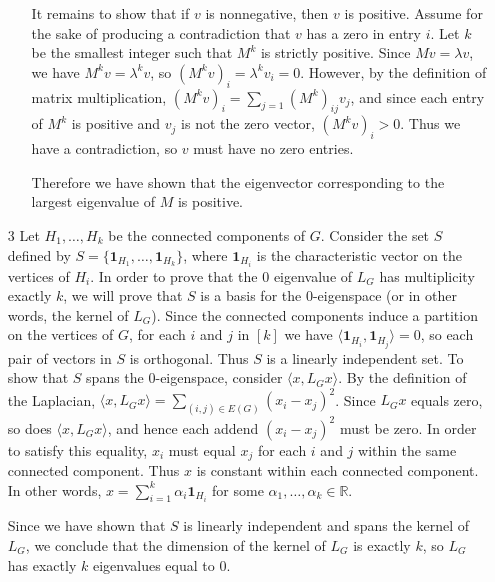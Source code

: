 \documentclass{article}
\newcommand{\R}{\mathbb{R}}
\newcommand{\1}{\mathbf{1}}
\newcommand{\0}{\mathbf{0}}
\begin{document}
\begin{enumerate}
\begin{enumerate}
    It remains to show that if $v$ is nonnegative, then $v$ is positive.
    Assume for the sake of producing a contradiction that $v$ has a zero in entry $i$.
    Let $k$ be the smallest integer such that $M^k$ is strictly positive.
    Since $M v = \lambda v$, we have $M^k v = \lambda^k v$, so $(M^k v)_i = \lambda^k v_i = 0$.
    However, by the definition of matrix multiplication, $(M^k v)_i = \sum_{j = 1} (M^k)_{ij} v_j$, and since each entry of $M^k$ is positive and $v_j$ is not the zero vector, $(M^k v)_i > 0$.
    Thus we have a contradiction, so $v$ must have no zero entries.

    Therefore we have shown that the eigenvector corresponding to the largest eigenvalue of $M$ is positive.
  \end{enumerate}

\item[3]
  Let $H_1, \dotsc, H_k$ be the connected components of $G$.
  Consider the set $S$ defined by $S = \{\1_{H_1}, \dotsc, \1_{H_k}\}$, where $\1_{H_i}$ is the characteristic vector on the vertices of $H_i$.
  In order to prove that the $0$ eigenvalue of $L_G$ has multiplicity exactly $k$, we will prove that $S$ is a basis for the $0$-eigenspace (or in other words, the kernel of $L_G$).
  Since the connected components induce a partition on the vertices of $G$, for each $i$ and $j$ in $[k]$ we have $\langle \1_{H_i}, \1_{H_j} \rangle = 0$, so each pair of vectors in $S$ is orthogonal.
  Thus $S$ is a linearly independent set.
  To show that $S$ spans the $0$-eigenspace, consider $\langle x, L_G x \rangle$.
  By the definition of the Laplacian, $\langle x, L_G x \rangle = \sum_{(i, j) \in E(G)} (x_i - x_j)^2$.
  Since $L_G x$ equals zero, so does $\langle x, L_G x \rangle$, and hence each addend $(x_i - x_j)^2$ must be zero.
  In order to satisfy this equality, $x_i$ must equal $x_j$ for each $i$ and $j$ within the same connected component.
  Thus $x$ is constant within each connected component.
  In other words, $x = \sum_{i = 1}^k \alpha_i \1_{H_i}$ for some $\alpha_1, \dotsc, \alpha_k \in \R$.

  Since we have shown that $S$ is linearly independent and spans the kernel of $L_G$, we conclude that the dimension of the kernel of $L_G$ is exactly $k$, so $L_G$ has exactly $k$ eigenvalues equal to $0$.


\end{enumerate}
\end{document}
